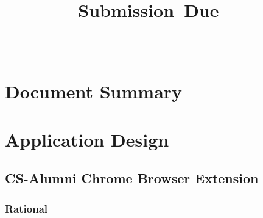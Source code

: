 \documentclass{article}
\title{
\vspace{2in}
\textmd{\textbf{\hmwkShortCode\\ \hmwkClass}}\\
\normalsize
\vspace{0.1in}
\textbf{\hmwkTitle}\\
\vspace{0.1in}
\small{Submission\ Due\ \hmwkClassTime\ \hmwkDueDate}\\
\vspace{3in}
}
\author{
\textbf{\hmwkAuthorName}\\
\hmwkStudentId
}
\date{} %
\begin{document}
\maketitle



\newpage
\tableofcontents
\newpage


\nocite{bara:2013:online}
\nocite{saa:2013:online}

\section{Document Summary}

\section{Application Design}

\subsection{CS-Alumni Chrome Browser Extension}

\subsubsection{Rational}
\end{document}
